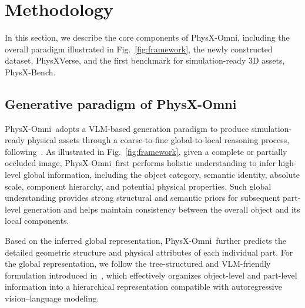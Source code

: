 \documentclass[11pt]{article}
\def\ourname{PhysX-Omni}
\def\ournewdata{PhysXVerse}
\def\ourbench{PhysX-Bench}
\begin{document}
\section{Methodology}


In this section, we describe the core components of \ourname, including the overall paradigm illustrated in Fig.~\ref{fig:framework}, the newly constructed dataset, \ournewdata, and the first benchmark for simulation-ready 3D assets, \ourbench.




\subsection{Generative paradigm of \ourname}

\ourname\ adopts a VLM-based generation paradigm to produce simulation-ready physical assets through a coarse-to-fine global-to-local reasoning process, following~\cite{cao2025physxanything}. As illustrated in Fig.~\ref{fig:framework}, given a complete or partially occluded image, \ourname\ first performs holistic understanding to infer high-level global information, including the object category, semantic identity, absolute scale, component hierarchy, and potential physical properties. Such global understanding provides strong structural and semantic priors for subsequent part-level generation and helps maintain consistency between the overall object and its local components.

Based on the inferred global representation, \ourname\ further predicts the detailed geometric structure and physical attributes of each individual part. For the global representation, we follow the tree-structured and VLM-friendly formulation introduced in~\cite{cao2025physx}, which effectively organizes object-level and part-level information into a hierarchical representation compatible with autoregressive vision--language modeling.
\end{document}

